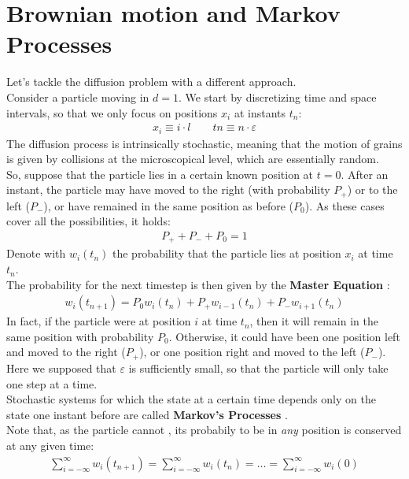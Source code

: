 \documentclass[../template.tex]{subfiles}
\begin{document}
\section{Brownian motion and Markov Processes}
Let's tackle the diffusion problem with a different approach.\\
Consider a particle moving in $d=1$. We start by discretizing time and space intervals, so that we only focus on positions $x_i$ at instants $t_n$:
\begin{align}
    x_i \equiv i \cdot l\qquad tn \equiv n \cdot \varepsilon
    \label{eqn:discretization}
\end{align} 
The diffusion process is intrinsically stochastic, meaning that the motion of grains is given by collisions at the microscopical level, which are essentially random.\\
So, suppose that the particle lies in a certain known position at $t=0$. After an instant, the particle may have moved to the right (with probability $P_+$) or to the left ($P_-$), or have remained in the same position as before ($P_0$). As these cases cover all the possibilities, it holds:
\begin{align*}
    P_+ + P_- + P_0 = 1
\end{align*}
Denote with $w_i(t_n)$ the probability that the particle lies at position $x_i$ at time $t_n$.\\
The probability for the next timestep is then given by the \textbf{Master Equation} :
\begin{align}
    w_i(t_{n+1}) = P_0 w_i(t_n) + P_+ w_{i-1}(t_n) + P_- w_{i+1}(t_n)
    \label{eqn:master-eq}
\end{align}
In fact, if the particle were at position $i$ at time $t_n$, then it will remain in the same position with probability $P_0$. Otherwise, it could have been one position left and moved to the right ($P_+$), or one position right and moved to the left ($P_-$).\\
Here we supposed that $\varepsilon$ is sufficiently small, so that the particle will only take one step at a time.\\

Stochastic systems for which the state at a certain time depends only on the state one instant before are called \textbf{Markov's Processes} .\\

Note that, as the particle cannot , its probabily to be in \textit{any} position is conserved at any given time: 
\begin{align*}
    \sum_{i=-\infty}^{\infty} w_i(t_{n+1}) = \sum_{i=-\infty}^{\infty} w_i(t_n) = \dots = \sum_{i=-\infty}^{\infty} w_i(0)
\end{align*}
\end{document}
